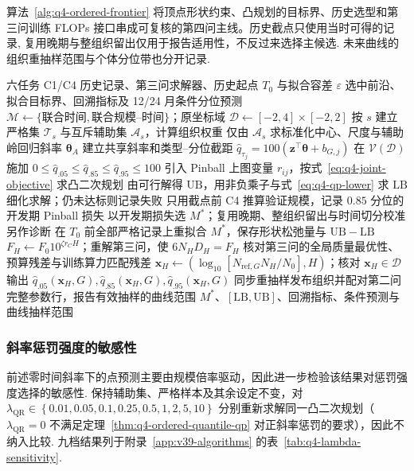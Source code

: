 算法~\ref{alg:q4-ordered-frontier} 将顶点形状约束、凸规划的目标界、历史选型和第三问训练 FLOPs 接口串成可复核的第四问主线。历史截点只使用当时可得的记录, 复用晚期与整组织留出仅用于报告适用性，不反过来选择主候选. 未来曲线的组织重抽样范围与个体分位带也分开记录.
\begin{algorithm}[H]
\caption{第四问的有序分位前沿拟合与条件情景预测}\label{alg:q4-ordered-frontier}
\small
\begin{algorithmic}[1]
\Require 六任务 C1/C4 历史记录、第三问求解器、历史起点 $T_0$ 与拟合容差 $\varepsilon$
\Ensure 选中前沿、拟合目标界、回溯指标及 12/24 月条件分位预测
\State $\mathcal M\gets\{\text{联合时间},\text{联合规模--时间}\}$；原坐标域 $\mathcal D\gets[-2,4]\times[-2,2]$
  \State 按 $s$ 建立严格集 $\mathcal T_s$ 与互斥辅助集 $\mathcal A_s$，计算组织权重
  \State 仅由 $\mathcal A_s$ 求标准化中心、尺度与辅助岭回归斜率 $\boldsymbol\theta_A$
  \State 建立共享斜率和类型--分位截距 $\widehat q_{\tau_j}=100(\boldsymbol z^\top\boldsymbol\theta+b_{G,j})$
  \State 在 $\mathcal V(\mathcal D)$ 施加 $0\le\widehat q_{.05}\le\widehat q_{.85}\le\widehat q_{.95}\le100$
  \State 引入 Pinball 上图变量 $r_{ij}$，按式~\eqref{eq:q4-joint-objective} 求凸二次规划
  \State 由可行解得 $\mathrm{UB}$，用非负乘子与式~\eqref{eq:q4-qp-lower} 求 $\mathrm{LB}$ 
   \State 细化求解；仍未达标则记录失败 \EndIf
  \State 只用截点前 C4 推算验证规模，记录 $0.85$ 分位的开发期 Pinball 损失
\EndFor
\State 以开发期损失选 $M^*$；复用晚期、整组织留出与时间切分校准另作诊断
\State 在 $T_0$ 前全部严格记录上重拟合 $M^*$，保存形状松弛量与 $\mathrm{UB}-\mathrm{LB}$
  \State $F_H\gets F_0 10^{\zeta r_C H}$；重解第三问，使 $6N_H D_H=F_H$ 
  \State 核对第三问的全局质量最优性、预算残差与训练算力匹配残差
    \State $\boldsymbol x_H\gets(\log_{10}[N_{\mathrm{ref},G}N_H/N_0],H)$；核对 $\boldsymbol x_H\in\mathcal D$
    \State 输出 $\widehat q_{.05}(\boldsymbol x_H,G),\widehat q_{.85}(\boldsymbol x_H,G),\widehat q_{.95}(\boldsymbol x_H,G)$
  \EndFor
\EndFor
\State 同步重抽样发布组织并配对第二问完整参数行，报告有效抽样的曲线范围
\State \Return $M^*$、$[\mathrm{LB},\mathrm{UB}]$、回溯指标、条件预测与曲线抽样范围
\end{algorithmic}
\end{algorithm}

\subsubsection{斜率惩罚强度的敏感性}
前述零时间斜率下的点预测主要由规模倍率驱动，因此进一步检验该结果对惩罚强度选择的敏感性. 保持辅助集、严格样本及其余设定不变，对 $\lambda_{\mathrm{QR}}\in \left\{ 0.01,0.05,0.1,0.25,0.5,1,2,5,10 \right\} $ 分别重新求解同一凸二次规划（$\lambda_{\mathrm{QR}}=0$ 不满足定理~\ref{thm:q4-ordered-quantile-qp} 对正斜率惩罚的要求），因此不纳入比较. 九档结果列于附录~\ref{app:v39-algorithms} 的表~\ref{tab:q4-lambda-sensitivity}.

